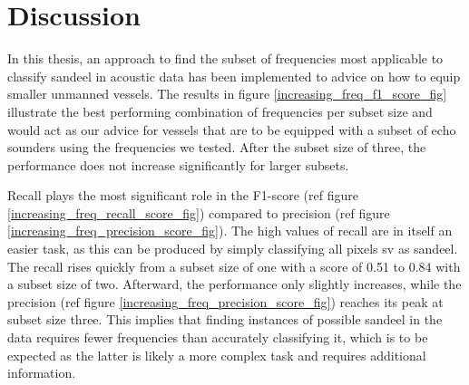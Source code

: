 \chapter{Discussion}
    
    In this thesis, an approach to find the subset of frequencies most applicable to classify sandeel in acoustic data has been implemented to advice on how to equip smaller unmanned vessels. The results in figure  \ref{increasing_freq_f1_score_fig} illustrate the best performing combination of frequencies per subset size and would act as our advice for vessels that are to be equipped  with a subset of echo sounders using the frequencies we tested. After the subset size of three, the performance does not increase significantly for larger subsets. 
    
    
    
    
    Recall plays the most significant role in the F1-score (ref figure \ref{increasing_freq_recall_score_fig}) compared to precision (ref figure \ref{increasing_freq_precision_score_fig}). The high values of recall are in itself an easier task, as this can be produced by simply classifying all pixels \gls{sv} as sandeel. The recall rises quickly from a subset size of one with a score of 0.51 to 0.84 with a subset size of two. Afterward, the performance  only slightly increases, while the precision (ref figure \ref{increasing_freq_precision_score_fig}) reaches its peak at subset size three. This implies that finding instances of possible sandeel in the data requires fewer frequencies than accurately classifying it, which is to be expected as the latter is likely a more complex task and requires additional information. 
    


